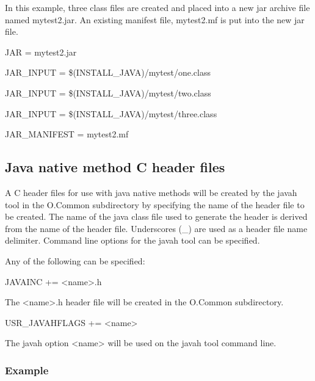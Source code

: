 In this example, three class files are created and placed into a new jar archive file named mytest2.jar. An existing manifest 
file, mytest2.mf is put into the new jar file.

\begin{description}\item JAR = mytest2.jar

\item JAR\_INPUT = \$(INSTALL\_JAVA)/mytest/one.class

\item JAR\_INPUT = \$(INSTALL\_JAVA)/mytest/two.class

\item JAR\_INPUT = \$(INSTALL\_JAVA)/mytest/three.class

\item JAR\_MANIFEST = mytest2.mf

\end{description}\subsection{Java native method C header files}

A C header files for use with java native methods will be created by the javah tool in the O.Common subdirectory by 
specifying the name of the header file to be created. The name of the java class file used to generate the header is derived 
from the name of the header file. Underscores (\_) are used as a header file name delimiter. Command line options for the 
javah tool can be specified.

Any of the following can be specified:

\begin{description}\item {}JAVAINC += \textless{}name\textgreater{}.h

\end{description}    The \textless{}name\textgreater{}.h header file will be created in the O.Common subdirectory.

\begin{description}\item {}USR\_JAVAHFLAGS += \textless{}name\textgreater{}

\end{description}    The javah option \textless{}name\textgreater{} will be used on the javah tool command line.

\subsubsection{Example}

